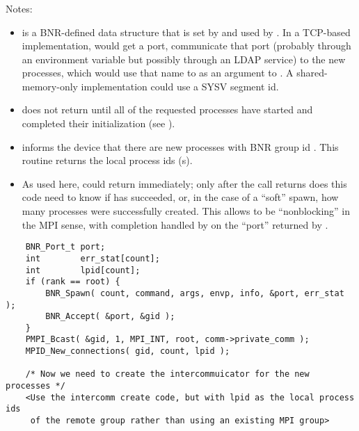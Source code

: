 \documentclass{article}
\begin{document}
\subsubsection{}

Notes:
\begin{itemize}
\item {} is a BNR-defined data structure that is set by
   and used by .   In a TCP-based
  implementation,  would get a port, communicate that port
  (probably through an environment variable but possibly through an LDAP
  service) to the new processes, which would use that name to as an argument
  to .  A shared-memory-only implementation could use a
  SYSV segment id.

\item {} does not return until all of the requested
  processes have started and completed their initialization (see
  ).

\item {} informs the device that there are
   new processes with BNR group id .  This routine
  returns the local process ids (s).

\item As used here,  could return immediately; only after
  the  call returns does this code need to know if 
   has succeeded, or, in the case of a ``soft'' spawn, how
  many processes were successfully created.  This allows 
  to be ``nonblocking'' in the MPI sense, with completion handled by
   on the ``port'' returned by .

\end{itemize}

\begin{verbatim}
    BNR_Port_t port;
    int        err_stat[count];
    int        lpid[count];
    if (rank == root) {
        BNR_Spawn( count, command, args, envp, info, &port, err_stat );
        BNR_Accept( &port, &gid );
    }
    PMPI_Bcast( &gid, 1, MPI_INT, root, comm->private_comm );
    MPID_New_connections( gid, count, lpid );

    /* Now we need to create the intercommuicator for the new processes */
    <Use the intercomm create code, but with lpid as the local process ids
     of the remote group rather than using an existing MPI group>
\end{verbatim}
\end{document}
